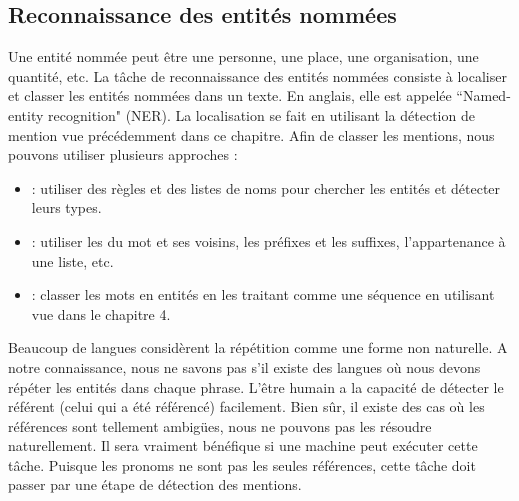 \documentclass{KodeBook}
\begin{document}
\subsection{Reconnaissance des entités nommées}

Une entité nommée peut être une personne, une place, une organisation, une quantité, etc.
La tâche de reconnaissance des entités nommées consiste à localiser et classer les entités nommées dans un texte. 
En anglais, elle est appelée ``Named-entity recognition" (NER). 
La localisation se fait en utilisant la détection de mention vue précédemment dans ce chapitre.
Afin de classer les mentions, nous pouvons utiliser plusieurs approches :
\begin{itemize}
	\item {} : utiliser des règles et des listes de noms pour chercher les entités et détecter leurs types.
	\item {} : utiliser les  du mot et ses voisins, les préfixes et les suffixes, l'appartenance à une liste, etc.
	\item {} : classer les mots en entités en les traitant comme une séquence en utilisant  vue dans le chapitre 4.
	
\end{itemize}



Beaucoup de langues considèrent la répétition comme une forme non naturelle. 
A notre connaissance, nous ne savons pas s'il existe des langues où nous devons répéter les entités dans chaque phrase. 
L'être humain a la capacité de détecter le référent (celui qui a été référencé) facilement. 
Bien sûr, il existe des cas où les références sont tellement ambigües, nous ne pouvons pas les résoudre naturellement. 
Il sera vraiment bénéfique si une machine peut exécuter cette tâche. 
Puisque les pronoms ne sont pas les seules références, cette tâche doit passer par une étape de détection des mentions. 
\end{document}
